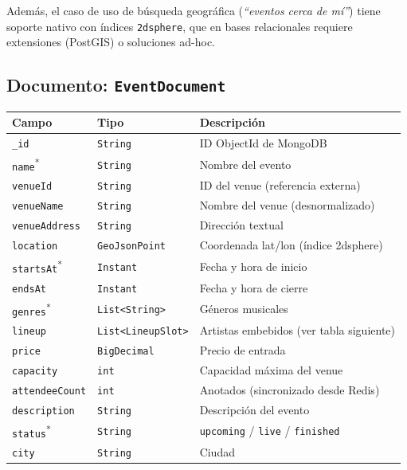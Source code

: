\documentclass[12pt, a4paper]{article}
\newcommand{\code}[1]{\texttt{#1}}
\newcommand{\idx}[1]{\texttt{#1}\textsuperscript{*}} %
\begin{document}
Además, el caso de uso de búsqueda geográfica (\emph{``eventos cerca de mí''})
tiene soporte nativo con índices \code{2dsphere}, que en bases relacionales
requiere extensiones (PostGIS) o soluciones ad-hoc.

\subsection{Documento: \code{EventDocument}}

\begin{tabularx}{\textwidth}{@{}llX@{}}
  \toprule
  \textbf{Campo}       & \textbf{Tipo}            & \textbf{Descripción} \\
  \midrule
  \code{\_id}          & \code{String}            & ID ObjectId de MongoDB \\
  \idx{name}           & \code{String}            & Nombre del evento \\
  \code{venueId}       & \code{String}            & ID del venue (referencia externa) \\
  \code{venueName}     & \code{String}            & Nombre del venue (desnormalizado) \\
  \code{venueAddress}  & \code{String}            & Dirección textual \\
  \code{location}      & \code{GeoJsonPoint}      & Coordenada lat/lon (índice 2dsphere) \\
  \idx{startsAt}       & \code{Instant}           & Fecha y hora de inicio \\
  \code{endsAt}        & \code{Instant}           & Fecha y hora de cierre \\
  \idx{genres}         & \code{List<String>}      & Géneros musicales \\
  \code{lineup}        & \code{List<LineupSlot>}  & Artistas embebidos (ver tabla siguiente) \\
  \code{price}         & \code{BigDecimal}        & Precio de entrada \\
  \code{capacity}      & \code{int}               & Capacidad máxima del venue \\
  \code{attendeeCount} & \code{int}               & Anotados (sincronizado desde Redis) \\
  \code{description}   & \code{String}            & Descripción del evento \\
  \idx{status}         & \code{String}            & \code{upcoming} / \code{live} / \code{finished} \\
  \code{city}          & \code{String}            & Ciudad \\
  \bottomrule
\end{tabularx}
\end{document}
